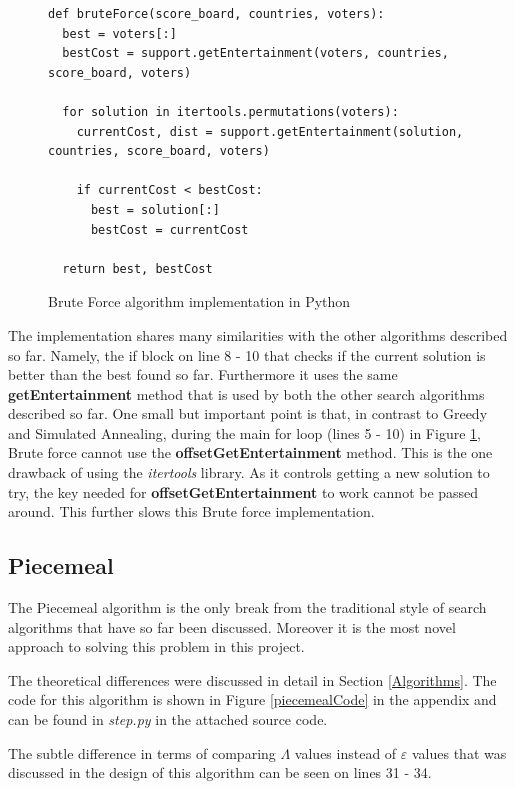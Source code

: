 \documentclass[12pt]{report}
\begin{document}
\begin{figure}[H]
\caption{Brute Force algorithm implementation in Python}
\label{bruteForce}
\begin{lstlisting}
def bruteForce(score_board, countries, voters):
  best = voters[:]
  bestCost = support.getEntertainment(voters, countries, score_board, voters)

  for solution in itertools.permutations(voters):
    currentCost, dist = support.getEntertainment(solution, countries, score_board, voters)

    if currentCost < bestCost:
      best = solution[:]
      bestCost = currentCost

  return best, bestCost
\end{lstlisting}
\end{figure}

The implementation shares many similarities with the other algorithms described so far. Namely, the if block on line 8 - 10 that checks if the current solution is better than the best found so far. Furthermore it uses the same \textbf{getEntertainment} method that is used by both the other search algorithms described so far. One small but important point is that, in contrast to Greedy and Simulated Annealing, during the main for loop (lines 5 - 10) in Figure \ref{bruteForce}, Brute force cannot use the \textbf{offsetGetEntertainment} method. This is the one drawback of using the \textit{itertools} library. As it controls getting a new solution to try, the key needed for \textbf{offsetGetEntertainment} to work cannot be passed around. This further slows this Brute force implementation.

\subsection{Piecemeal}\label{Imp-Piecemeal}
The Piecemeal algorithm is the only break from the traditional style of search algorithms that have so far been discussed. Moreover it is the most novel approach to solving this problem in this project.

The theoretical differences were discussed in detail in Section \ref{Algorithms}. The code for this algorithm is shown in Figure \ref{piecemealCode} in the appendix and can be found in \textit{step.py} in the attached source code.

The subtle difference in terms of comparing $\Lambda$ values instead of $\varepsilon$ values that was discussed in the design of this algorithm can be seen on lines 31 - 34.
\end{document}
